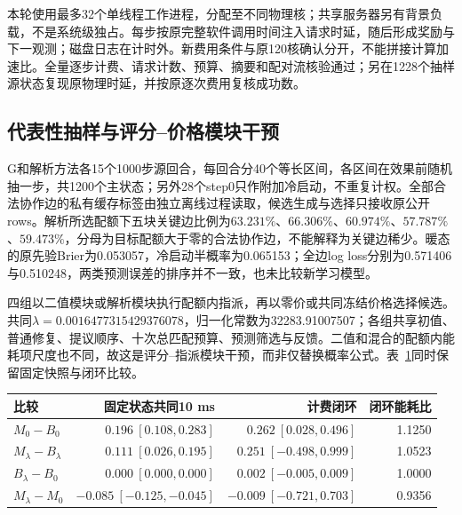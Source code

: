 本轮使用最多32个单线程工作进程，分配至不同物理核；共享服务器另有背景负载，不是系统级独占。每步按原完整软件调用时间注入请求时延，随后形成奖励与下一观测；磁盘日志在计时外。新费用条件与原120核确认分开，不能拼接计算加速比。全量逐步计费、请求计数、预算、摘要和配对流核验通过；另在1228个抽样源状态复现原物理时延，并按原逐次费用复核成功数。

\subsection{代表性抽样与评分--价格模块干预}

G和解析方法各15个1000步源回合，每回合分40个等长区间，各区间在效果前随机抽一步，共1200个主状态；另外28个step0只作附加冷启动，不重复计权。全部合法协作边的私有缓存标签由独立离线过程读取，候选生成与选择只接收原公开rows。解析所选配额下五块关键边比例为$63.231\%$、$66.306\%$、$60.974\%$、$57.787\%$、$59.473\%$，分母为目标配额大于零的合法协作边，不能解释为关键边稀少。暖态的原先验Brier为0.053057，冷启动半概率为0.065153；全边log loss分别为0.571406与0.510248，两类预测误差的排序并不一致，也未比较新学习模型。

四组以二值模块或解析模块执行配额内指派，再以零价或共同冻结价格选择候选。共同$\lambda=0.0016477315429376078$，归一化常数为32283.91007507；各组共享初值、普通修复、提议顺序、十次总匹配预算、预测筛选与反馈。二值和混合的配额内能耗项尺度也不同，故这是评分--指派模块干预，而非仅替换概率公式。表~\ref{tab:cost-stage-b-components}同时保留固定快照与闭环比较。

\begin{table}[!htbp]
\centering
{}
\label{tab:cost-stage-b-components}
\small
\begin{tabular}{lrrr}
\toprule
比较 & 固定状态共同10 ms & 计费闭环 & 闭环能耗比\\
\midrule
$M_0-B_0$ & $0.196\ [0.108,0.283]$ & $0.262\ [0.028,0.496]$ & 1.1250\\
$M_\lambda-B_\lambda$ & $0.111\ [0.026,0.195]$ & $0.251\ [-0.498,0.999]$ & 1.0523\\
$B_\lambda-B_0$ & $0.000\ [0.000,0.000]$ & $0.002\ [-0.005,0.009]$ & 1.0000\\
$M_\lambda-M_0$ & $-0.085\ [-0.125,-0.045]$ & $-0.009\ [-0.721,0.703]$ & 0.9356\\
\bottomrule
\end{tabular}
\end{table}

